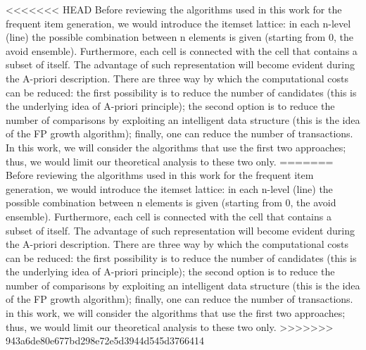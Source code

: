 \documentclass[12pt,%
               a4paper,%
               oneside,openany,%
               titlepage,%
               headinclude,footinclude,%
               BCOR5mm,%
               cleardoublepage=empty,%
               tablecaptionabove,%
               floatperchapter,
               ]{scrreprt}                 %
\begin{document}
<<<<<<< HEAD
Before reviewing the algorithms used in this work for the frequent item generation, we would introduce the itemset lattice: in each n-level (line) the possible combination between n elements is given (starting from 0, the avoid ensemble). Furthermore, each cell is connected with the cell that contains a subset of itself. The advantage of such representation will become evident during the A-priori description. There are three way by which the computational costs can be reduced: the first possibility is to reduce the number of candidates (this is the underlying idea of A-priori principle); the second option is to reduce the number of comparisons by exploiting an intelligent data structure (this is the idea of the FP growth algorithm); finally, one can reduce the number of transactions. In this work, we will consider the algorithms that use the first two approaches; thus, we would limit our theoretical analysis to these two only.
=======
Before reviewing the algorithms used in this work for the frequent item generation, we would introduce the itemset lattice: in each n-level (line) the possible combination between n elements is given (starting from 0, the avoid ensemble). Furthermore, each cell is connected with the cell that contains a subset of itself. The advantage of such representation will become evident during the A-priori description. There are three way by which the computational costs can be reduced: the first possibility is to reduce the number of candidates (this is the underlying idea of A-priori principle); the second option is to reduce the number of comparisons by exploiting an intelligent data structure (this is the idea of the FP growth algorithm); finally, one can reduce the number of transactions. in this work, we will consider the algorithms that use the first two approaches; thus, we would limit our theoretical analysis to these two only.
>>>>>>> 943a6de80e677bd298e72e5d3944d545d3766414
\end{document}
